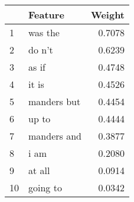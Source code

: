 \begin{tabular}{llr}
\toprule
{} &      Feature &  Weight \\
\midrule
1  &      was the &  0.7078 \\
2  &       do n't &  0.6239 \\
3  &        as if &  0.4748 \\
4  &        it is &  0.4526 \\
5  &  manders but &  0.4454 \\
6  &        up to &  0.4444 \\
7  &  manders and &  0.3877 \\
8  &         i am &  0.2080 \\
9  &       at all &  0.0914 \\
10 &     going to &  0.0342 \\
\bottomrule
\end{tabular}
